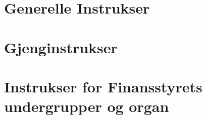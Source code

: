 \documentclass[11pt, a4paper, twosided]{book}
\renewcommand{\part}[1]{
    \cleardoublepage
    \addcontentsline{toc}{part}{#1}
    \vspace*{7cm}
    \begin{center}
        {\Huge\textbf{ #1}}
        \vfill
        \texttt{[image: anniversary2010-logo]}
    \end{center}
    \thispagestyle{empty}
    \cleardoublepage
}
\begin{document}
\chapter*{Generelle Instrukser}














\chapter*{Gjenginstrukser}




































\chapter*{Instrukser for Finansstyrets undergrupper og organ}





\end{document}
